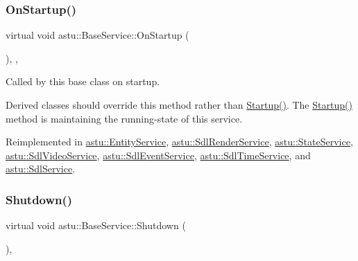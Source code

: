 \subsubsection{\texorpdfstring{On\+Startup()}{OnStartup()}}
{\footnotesize\ttfamily virtual void astu\+::\+Base\+Service\+::\+On\+Startup (\begin{DoxyParamCaption}{ }\end{DoxyParamCaption})\hspace{0.3cm}{\ttfamily [inline]}, {\ttfamily [protected]}, {\ttfamily [virtual]}}

Called by this base class on startup.

Derived classes should override this method rather than {\ttfamily \hyperlink{classastu_1_1BaseService_a59dade033dcb44dd32155c526a3a58e2}{Startup()}}. The {\ttfamily \hyperlink{classastu_1_1BaseService_a59dade033dcb44dd32155c526a3a58e2}{Startup()}} method is maintaining the running-\/state of this service. 

Reimplemented in \hyperlink{classastu_1_1EntityService_a293ff7c8b84837b08cdabe98ed8a23ea}{astu\+::\+Entity\+Service}, \hyperlink{classastu_1_1SdlRenderService_a38abd541e8075e5e4eb702ca99c9b0a5}{astu\+::\+Sdl\+Render\+Service}, \hyperlink{classastu_1_1StateService_a06419feca958b72db99dde6eda301f86}{astu\+::\+State\+Service}, \hyperlink{classastu_1_1SdlVideoService_add229ac2af59a4aea090e4de4c67e530}{astu\+::\+Sdl\+Video\+Service}, \hyperlink{classastu_1_1SdlEventService_a71805a124600a23e48158daa5dc57fff}{astu\+::\+Sdl\+Event\+Service}, \hyperlink{classastu_1_1SdlTimeService_ac11551691bb14289020028a2a162c7d6}{astu\+::\+Sdl\+Time\+Service}, and \hyperlink{classastu_1_1SdlService_a2fcb46537de794ab6e4f5e043b26ff60}{astu\+::\+Sdl\+Service}.

\mbox{\label{classastu_1_1BaseService_a7095888244052db294d58738c0d187fb}} 
\subsubsection{\texorpdfstring{Shutdown()}{Shutdown()}}
{\footnotesize\ttfamily virtual void astu\+::\+Base\+Service\+::\+Shutdown (\begin{DoxyParamCaption}{ }\end{DoxyParamCaption})\hspace{0.3cm}{\ttfamily [override]}, {\ttfamily [virtual]}}

